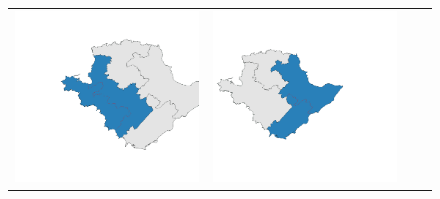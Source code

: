 \begin{figure}[p]
\begin{tabularx}{1\textwidth}{XXXX}
\includegraphics[width=1\linewidth]{images/ch6/mergefocus/20}&
\includegraphics[width=1\linewidth]{images/ch6/mergefocus/21}&

\end{tabularx}
\end{figure}
